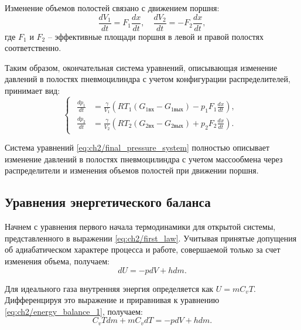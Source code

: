 Изменение объемов полостей связано с движением поршня:
\begin{equation}\label{eq:ch2/volume_change}
    \frac{dV_1}{dt} = F_1\frac{dx}{dt}, \quad \frac{dV_2}{dt} = -F_2\frac{dx}{dt},
\end{equation}
где $F_1$ и $F_2$ -- эффективные площади поршня в левой и правой полостях соответственно.

Таким образом, окончательная система уравнений, описывающая изменение
давлений в полостях пневмоцилиндра с учетом конфигурации распределителей, принимает вид:
\begin{equation}\label{eq:ch2/final_pressure_system}
    \begin{cases}
        \begin{aligned}
            \frac{dp_1}{dt} & = \frac{\gamma}{V_1}\left(RT_1(G_{1\text{вх}} - G_{1\text{вых}}) - p_1 F_1\frac{dx}{dt}\right), \\
            \frac{dp_2}{dt} & = \frac{\gamma}{V_2}\left(RT_2(G_{2\text{вх}} - G_{2\text{вых}}) + p_2 F_2\frac{dx}{dt}\right).
        \end{aligned}
    \end{cases}
\end{equation}

Система уравнений \eqref{eq:ch2/final_pressure_system} полностью описывает
изменение давлений в полостях пневмоцилиндра с учетом массообмена через
распределители и изменения объемов полостей при движении поршня.

\subsection{Уравнения энергетического баланса}\label{sec:ch2/sec2/subsec3}

Начнем с уравнения первого начала термодинамики для открытой системы, представленного в выражении \eqref{eq:ch2/first_law}. Учитывая принятые допущения об адиабатическом характере процесса и работе, совершаемой только за счет изменения объема, получаем:
\begin{equation}\label{eq:ch2/energy_balance_1}
    dU = -pdV + hdm.
\end{equation}

Для идеального газа внутренняя энергия определяется как $U = mC_vT$. Дифференцируя это выражение и приравнивая к уравнению \eqref{eq:ch2/energy_balance_1}, получаем:
\begin{equation}\label{eq:ch2/energy_balance_2}
    C_vTdm + mC_vdT = -pdV + hdm.
\end{equation}

